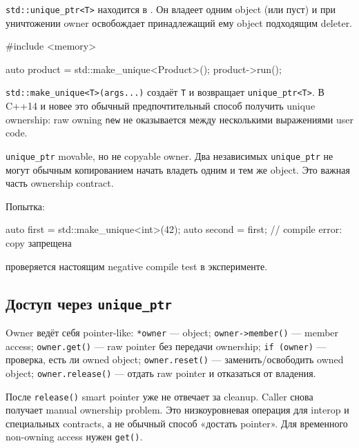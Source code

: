 \texttt{std::unique\_ptr<T>} находится в . Он владеет
одним object (или пуст) и при уничтожении owner освобождает принадлежащий ему
object подходящим deleter.

\begin{cppcode}
#include <memory>

auto product = std::make_unique<Product>();
product->run();
\end{cppcode}

\texttt{std::make\_unique<T>(args...)} создаёт \texttt{T} и возвращает
\texttt{unique\_ptr<T>}. В C++14 и новее это обычный предпочтительный способ
получить unique ownership: raw owning \texttt{new} не оказывается между
несколькими выражениями user code.

\begin{standardbox}
\texttt{unique\_ptr} movable, но не copyable owner. Два независимых
\texttt{unique\_ptr} не могут обычным копированием начать владеть одним и тем же
object. Это важная часть ownership contract.
\end{standardbox}

Попытка:

\begin{cppcode}
auto first = std::make_unique<int>(42);
auto second = first; // compile error: copy запрещена
\end{cppcode}

проверяется настоящим negative compile test в эксперименте.

\subsection{Доступ через \texttt{unique\_ptr}}

Owner ведёт себя pointer-like:
\texttt{*owner} --- object; \texttt{owner->member()} --- member access; \texttt{owner.get()} --- raw pointer без передачи ownership; \texttt{if (owner)} --- проверка, есть ли owned object; \texttt{owner.reset()} --- заменить/освободить owned object; \texttt{owner.release()} --- отдать raw pointer и отказаться от владения.

\begin{warningbox}
После \texttt{release()} smart pointer уже не отвечает за cleanup. Caller снова
получает manual ownership problem. Это низкоуровневая операция для interop и
специальных contracts, а не обычный способ «достать pointer».
Для временного non-owning access нужен \texttt{get()}.
\end{warningbox}

